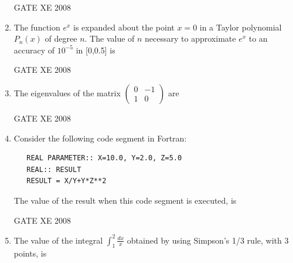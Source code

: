 \documentclass[12pt]{article}
\begin{document}
\begin{enumerate}
GATE XE 2008
\item The function $e^x$ is expanded about the point $x=0$ in a Taylor polynomial $P_{n}(x)$ of degree $n$. The value of $n$ necessary to approximate $e^x$ to an accuracy of $10^{-5}$ in [0,0.5] is

\begin{enumerate}
\end{enumerate}

GATE XE 2008
\item The eigenvalues of the matrix $\begin{pmatrix}0&-1\\1&0\end{pmatrix}$ are\newline

\begin{enumerate}
\end{enumerate}

GATE XE 2008
\item  Consider the following code segment in Fortran:
\begin{verbatim}
   REAL PARAMETER:: X=10.0, Y=2.0, Z=5.0
   REAL:: RESULT
   RESULT = X/Y+Y*Z**2
\end{verbatim}
The value of the result when this code segment is executed, is

\begin{enumerate}
\end{enumerate}

GATE XE 2008
\item The value of the integral $\int_{1}^{2} \frac{dx}{x}$ obtained by using Simpson's 1/3 rule, with 3 points, is


\end{enumerate}
\end{document}
